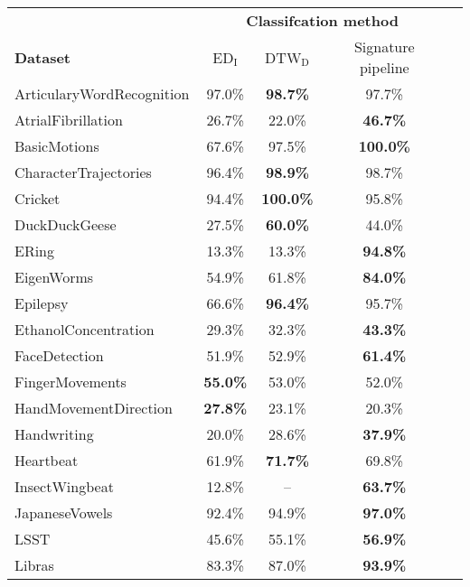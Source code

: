 \begin{tabular}{lcccc}
    \toprule
    & \multicolumn{3}{c}{\textbf{Classifcation method}}\\
    \cmidrule{2-4}
    {\textbf{Dataset}} &   ED$_\text{I}$ &   DTW$_\text{D}$ & Signature pipeline \\
    \midrule
    ArticularyWordRecognition &  97.0\% &   \textbf{98.7\%} &              97.7\% \\
    AtrialFibrillation        &  26.7\% &   22.0\% &              \textbf{46.7\%} \\
    BasicMotions              &  67.6\% &   97.5\% &             \textbf{100.0\%} \\
    CharacterTrajectories     &  96.4\% &   \textbf{98.9\%} &              98.7\% \\
    Cricket                   &  94.4\% &  \textbf{100.0\%} &              95.8\% \\
    DuckDuckGeese             &  27.5\% &   \textbf{60.0\%} &              44.0\% \\
    ERing                     &  13.3\% &   13.3\% &              \textbf{94.8\%} \\
    EigenWorms                &  54.9\% &   61.8\% &              \textbf{84.0\%} \\
    Epilepsy                  &  66.6\% &   \textbf{96.4\%} &              95.7\% \\
    EthanolConcentration      &  29.3\% &   32.3\% &              \textbf{43.3\%} \\
    FaceDetection             &  51.9\% &   52.9\% &              \textbf{61.4\%} \\
    FingerMovements           &  \textbf{55.0\%} &   53.0\% &              52.0\% \\
    HandMovementDirection     &  \textbf{27.8\%} &   23.1\% &              20.3\% \\
    Handwriting               &  20.0\% &   28.6\% &              \textbf{37.9\%} \\
    Heartbeat                 &  61.9\% &   \textbf{71.7\%} &              69.8\% \\
    InsectWingbeat            &  12.8\% &       -- &              \textbf{63.7\%} \\
    JapaneseVowels            &  92.4\% &   94.9\% &              \textbf{97.0\%} \\
    LSST                      &  45.6\% &   55.1\% &              \textbf{56.9\%} \\
    Libras                    &  83.3\% &   87.0\% &              \textbf{93.9\%} \\

\end{tabular}
